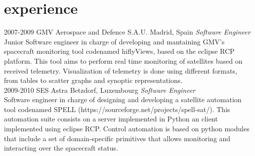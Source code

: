\documentclass[]{friggeri-cv}
\begin{document}
\section{experience}

\begin{entrylist}
\entry
{2007-2009}
{GMV Aerospace and Defence S.A.U.}
{Madrid, Spain}
{\emph{Software Engineer} \\
Junior Software engineer in charge of developing and mantaining GMV's spacecraft monitoring tool codenamed hiflyViews, based on the eclipse RCP platform.
This tool aims to perform real time monitoring of satellites based on received telemetry. Visualization of telemetry is done using different formats,
from tables to scatter graphs and synoptic representations.} \\
\entry
{2009-2010}
{SES Astra}
{Betzdorf, Luxembourg}
{\emph{Software Engineer} \\
Software engineer in charge of designing and developing a satellite automation tool codenamed SPELL (https://sourceforge.net/projects/spell-sat/).
This automation suite consists on a server implemented in Python an client implemented using eclipse RCP.
Control automation is based on python modules that include a set of domain-specific primitives that allows monitoring and interacting over the
spacecraft status.} \\
\end{entrylist}
\end{document}
